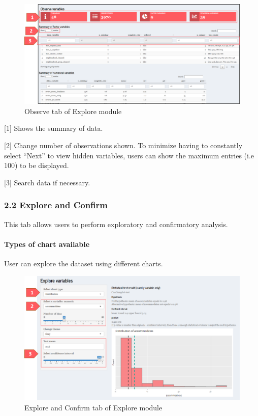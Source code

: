 \documentclass[
  12pt,
]{article}
\begin{document}
\begin{figure}[H]

{\centering \includegraphics[width=1\linewidth]{images/observe} 

}

\caption{Observe tab of Explore module}\label{fig:unnamed-chunk-2}
\end{figure}

{[}1{]} Shows the summary of data.

{[}2{]} Change number of observations shown. To minimize having to
constantly select ``Next'' to view hidden variables, users can show the
maximum entries (i.e 100) to be displayed.

{[}3{]} Search data if necessary.

\hypertarget{explore-and-confirm}{%
\subsubsection{2.2 Explore and Confirm}\label{explore-and-confirm}}

This tab allows users to perform exploratory and confirmatory analysis.

\hypertarget{types-of-chart-available}{%
\paragraph{Types of chart available}\label{types-of-chart-available}}

User can explore the dataset using different charts.

\begin{figure}[H]

{\centering \includegraphics[width=0.95\linewidth]{images/explore2} 

}

\caption{Explore and Confirm tab of Explore module}\label{fig:unnamed-chunk-3}
\end{figure}
\end{document}
